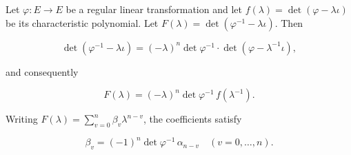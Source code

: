 Let $\varphi: E \to E$ be a regular linear transformation and let $f(\lambda) = \det(\varphi - \lambda \iota)$ be its characteristic polynomial. Let $F(\lambda) = \det(\varphi^{-1} - \lambda \iota)$. Then

$$\det(\varphi^{-1} - \lambda \iota) = (-\lambda)^n \det \varphi^{-1} \cdot \det(\varphi - \lambda^{-1} \iota),$$

and consequently

$$F(\lambda) = (-\lambda)^n \det \varphi^{-1} \, f(\lambda^{-1}).$$

Writing $F(\lambda) = \sum_{v=0}^{n} \beta_v \lambda^{n-v}$, the coefficients satisfy

$$\beta_v = (-1)^n \det \varphi^{-1} \, \alpha_{n-v} \quad (v = 0, \ldots, n).$$
